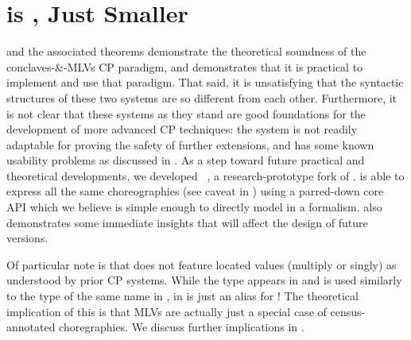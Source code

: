 \chapter{\minichor is \MultiChor, Just Smaller}
\label{sec:future}

\HLSCentral and the associated theorems demonstrate the theoretical soundness of the conclaves-\&-MLVs
CP paradigm,
and \MultiChor demonstrates that it is practical to implement and use that paradigm.
That said, it is unsatisfying that the syntactic structures of these two systems are so different from each other.
Furthermore, it is not clear that these systems as they stand are good foundations for the development of more advanced CP techniques:
the \HLSCentral system is not readily adaptable for proving the safety of further extensions,
and \MultiChor has some known usability problems as discussed in .
As a step toward future practical and theoretical developments, we developed \minichor~\cite{minichor-repo},
a research-prototype fork of \MultiChor.
\minichor is able to express all the same choreographies (see caveat in )
using a parred-down core API which we believe is simple enough to directly model in a formalism.
\minichor also demonstrates some immediate insights that will affect
the design of future \MultiChor versions.

Of particular note is that \minichor does not feature located values (multiply or singly) as understood by prior CP systems.
While the type  appears in \minichor and is used similarly to the type of the same name in \MultiChor,
in \minichor {} is just an alias for !
The theoretical implication of this is that MLVs are actually just a special case of census-annotated choregraphies.
We discuss further implications in .

